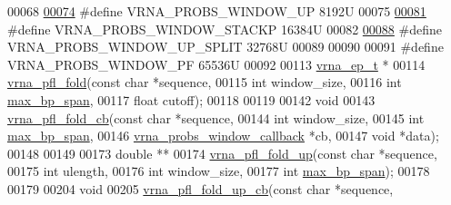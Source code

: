 \begin{DoxyCode}
00068 
\hyperlink{group__local__pf__fold_ga18325811c7dfc7b7d9d4ac37f4353615}{00074} \textcolor{preprocessor}{#define VRNA\_PROBS\_WINDOW\_UP   8192U}
00075 
\hyperlink{group__local__pf__fold_ga0a13fc668b02f21b225e2334e4caac08}{00081} \textcolor{preprocessor}{#define VRNA\_PROBS\_WINDOW\_STACKP   16384U}
00082 
\hyperlink{group__local__pf__fold_ga9068f4ec008bf1c042a9357f5c2c5e13}{00088} \textcolor{preprocessor}{#define VRNA\_PROBS\_WINDOW\_UP\_SPLIT   32768U}
00089 
00090 
00091 \textcolor{preprocessor}{#define VRNA\_PROBS\_WINDOW\_PF        65536U}
00092 
00113 \hyperlink{group__struct__utils_structvrna__elem__prob__s}{vrna\_ep\_t} *
00114 \hyperlink{group__local__pf__fold_ga6267230f20cab0e2315375310b4dad85}{vrna\_pfl\_fold}(\textcolor{keyword}{const} \textcolor{keywordtype}{char}  *sequence,
00115               \textcolor{keywordtype}{int}         window\_size,
00116               \textcolor{keywordtype}{int}         \hyperlink{group__model__details_ga18df869af0d70101106458fc3f027806}{max\_bp\_span},
00117               \textcolor{keywordtype}{float}       cutoff);
00118 
00119 
00142 \textcolor{keywordtype}{void}
00143 \hyperlink{group__local__pf__fold_ga8dc3788e66420f524f2bfc0b685a939d}{vrna\_pfl\_fold\_cb}(\textcolor{keyword}{const} \textcolor{keywordtype}{char}                 *sequence,
00144                  \textcolor{keywordtype}{int}                        window\_size,
00145                  \textcolor{keywordtype}{int}                        \hyperlink{group__model__details_ga18df869af0d70101106458fc3f027806}{max\_bp\_span},
00146                  \hyperlink{LPfold_8h_abe710a1182e6db69cc75329dfc9bed67}{vrna\_probs\_window\_callback} *cb,
00147                  \textcolor{keywordtype}{void}                       *data);
00148 
00149 
00173 \textcolor{keywordtype}{double} **
00174 \hyperlink{group__local__pf__fold_ga1dd5c51b797c961124912e289bff553a}{vrna\_pfl\_fold\_up}(\textcolor{keyword}{const} \textcolor{keywordtype}{char} *sequence,
00175                  \textcolor{keywordtype}{int}        ulength,
00176                  \textcolor{keywordtype}{int}        window\_size,
00177                  \textcolor{keywordtype}{int}        \hyperlink{group__model__details_ga18df869af0d70101106458fc3f027806}{max\_bp\_span});
00178 
00179 
00204 \textcolor{keywordtype}{void}
00205 \hyperlink{group__local__pf__fold_ga8958d91b1f1aebfb32b58805d141ccf3}{vrna\_pfl\_fold\_up\_cb}(\textcolor{keyword}{const} \textcolor{keywordtype}{char}                  *sequence,

\end{DoxyCode}
